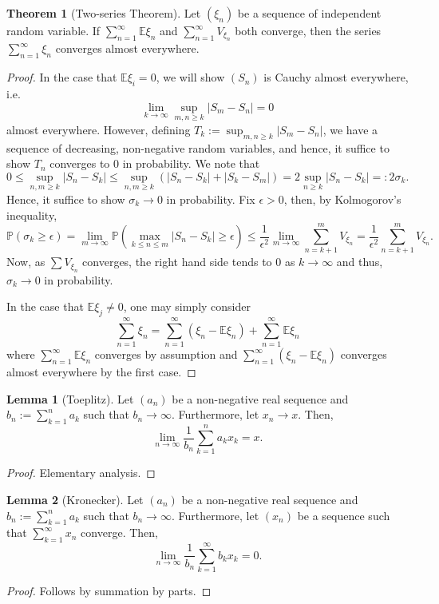 \documentclass[]{article}
\theoremstyle{definition}
\newtheorem{theorem}{Theorem}
\theoremstyle{definition}
\newtheorem{lemma}{Lemma}[section]
\begin{document}
\begin{theorem}[Two-series Theorem]
  Let \((\xi_n)\) be a sequence of independent random variable. If 
  \(\sum_{n = 1}^\infty \mathbb{E} \xi_n\) and \(\sum_{n = 1}^\infty V_{\xi_n}\) 
  both converge, then the series \(\sum_{n = 1}^\infty \xi_n\) converges almost 
  everywhere.
\end{theorem}
\begin{proof}
  In the case that \(\mathbb{E}\xi_i = 0\), we will show \((S_n)\) is Cauchy 
  almost everywhere, i.e. 
  \[\lim_{k \to \infty} \sup_{m, n \ge k}|S_m - S_n| = 0\]
  almost everywhere. However, defining \(T_k := \sup_{m, n \ge k}|S_m - S_n|\), 
  we have a sequence of decreasing, non-negative random variables, and hence, 
  it suffice to show \(T_n\) converges to 0 in probability. We note that 
  \[0 \le \sup_{n, m \ge k}|S_n - S_k| \le 
    \sup_{n, m \ge k}(|S_n - S_k| + |S_k - S_m|) = 
    2\sup_{n \ge k}|S_n - S_k| =: 2\sigma_k.\]
  Hence, it suffice to show \(\sigma_k \to 0\) in probability. Fix \(\epsilon > 0\), 
  then, by Kolmogorov's inequality, 
  \[\mathbb{P}(\sigma_k \ge \epsilon) = 
    \lim_{m \to \infty} \mathbb{P}(\max_{k \le n \le m}|S_n - S_k| \ge \epsilon)
    \le \frac{1}{\epsilon^2} \lim_{m \to \infty} \sum_{n = k + 1}^m V_{\xi_n}
     = \frac{1}{\epsilon^2} \sum_{n = k + 1}^m V_{\xi_n}.\]
  Now, as \(\sum V_{\xi_n}\) converges, the right hand side tends to 0 as 
  \(k \to \infty\) and thus, \(\sigma_k \to 0\) in probability.

  In the case that \(\mathbb{E}\xi_j \neq 0\), one may simply consider 
  \[\sum_{n = 1}^\infty \xi_n = \sum_{n = 1}^\infty (\xi_n - \mathbb{E}\xi_n) 
    + \sum_{n = 1}^\infty \mathbb{E}\xi_n\]
  where \(\sum_{n = 1}^\infty \mathbb{E}\xi_n\) converges by assumption and 
  \(\sum_{n = 1}^\infty (\xi_n - \mathbb{E}\xi_n)\) converges almost everywhere 
  by the first case.
\end{proof}

\begin{lemma}[Toeplitz]
  Let \((a_n)\) be a non-negative real sequence and \(b_n := \sum_{k = 1}^n a_k\) 
  such that \(b_n \to \infty\). Furthermore, let \(x_n \to x\). Then, 
  \[\lim_{n \to \infty}\frac{1}{b_n} \sum_{k = 1}^n a_k x_k = x.\]
\end{lemma}
\begin{proof}
  Elementary analysis.
\end{proof}

\begin{lemma}[Kronecker]
  Let \((a_n)\) be a non-negative real sequence and \(b_n := \sum_{k = 1}^n a_k\) 
  such that \(b_n \to \infty\). Furthermore, let \((x_n)\) be a sequence such that 
  \(\sum_{k = 1}^\infty x_n\) converge. Then, 
  \[\lim_{n \to \infty}\frac{1}{b_n}\sum_{k = 1}^\infty b_k x_k = 0.\]
\end{lemma}
\begin{proof}
  Follows by summation by parts.
\end{proof}
\end{document}
